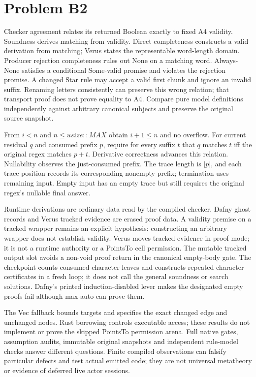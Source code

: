 \documentclass[11pt]{article}
\begin{document}
\section*{Problem B2}\label{ans:B2}
\begin{answer}
Checker agreement relates its returned Boolean exactly to fixed A4 validity.
Soundness derives matching from validity. Direct completeness constructs a valid
derivation from matching; Verus states the representable word-length domain.
Producer rejection completeness rules out None on a matching word. Always-None
satisfies a conditional Some-valid promise and violates the rejection promise.
A changed Star rule may accept a valid first chunk and ignore an invalid suffix.
Renaming letters consistently can preserve this wrong relation; that transport
proof does not prove equality to A4. Compare pure model definitions independently
against arbitrary canonical subjects and preserve the original source snapshot.

From $i<n$ and $n\leq\mathit{usize::MAX}$ obtain $i+1\leq n$ and no overflow.
For current residual $q$ and consumed prefix $p$, require for every suffix $t$
that $q$ matches $t$ iff the original regex matches $p+t$. Derivative correctness
advances this relation. Nullability observes the just-consumed prefix. The trace
length is $|p|$, and each trace position records its corresponding nonempty
prefix; termination uses remaining input. Empty input has an empty trace but
still requires the original regex's nullable final answer.

Runtime derivations are ordinary data read by the compiled checker. Dafny ghost
records and Verus tracked evidence are erased proof data. A validity premise on
a tracked wrapper remains an explicit hypothesis: constructing an arbitrary
wrapper does not establish validity. Verus moves tracked evidence in proof mode;
it is not a runtime authority or a PointsTo cell permission. The mutable tracked
output slot avoids a non-void proof return in the canonical empty-body gate.
The checkpoint counts consumed character leaves and constructs repeated-character
certificates in a fresh loop; it does not call the general soundness or search
solutions. Dafny's printed induction-disabled lever makes the designated empty
proofs fail although max-auto can prove them.

The Vec fallback bounds targets and specifies the exact changed edge and
unchanged nodes. Rust borrowing controls executable access; these results do not
implement or prove the skipped PointsTo permission arena. Full native gates,
assumption audits, immutable original snapshots and independent rule-model
checks answer different questions. Finite compiled observations can falsify
particular defects and test actual emitted code; they are not universal
metatheory or evidence of deferred live actor sessions.
\end{answer}
\end{document}
